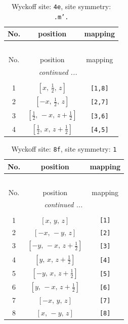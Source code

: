 \documentclass[fleqn,8pt]{jsarticle}
\begin{document}
\begin{longtable}{ccc}
\caption{Wyckoff site: {\tt 4e}, site symmetry: {\tt .m'.}}
 \\
 \hline \hline
No. & position & mapping \\ \hline \endfirsthead

\multicolumn{2}{l}{\tablename\ \thetable{}} \\
 \hline \hline
No. & position & mapping \\ \hline \endhead

 \hline \hline
\multicolumn{2}{r}{\footnotesize\it continued ...} \\ \endfoot

 \hline \hline
\multicolumn{2}{r}{} \\ \endlastfoot

1 & $\left[ x,\, \frac{1}{2},\, z \right]$ & {\tt [1,8]} \\ \hline
2 & $\left[ - x,\, \frac{1}{2},\, z \right]$ & {\tt [2,7]} \\ \hline
3 & $\left[ \frac{1}{2},\, - x,\, z + \frac{1}{2} \right]$ & {\tt [3,6]} \\ \hline
4 & $\left[ \frac{1}{2},\, x,\, z + \frac{1}{2} \right]$ & {\tt [4,5]} \\
\end{longtable}
\renewcommand{\arraystretch}{1.2}
\begin{longtable}{ccc}
\caption{Wyckoff site: {\tt 8f}, site symmetry: {\tt 1}}
 \\
 \hline \hline
No. & position & mapping \\ \hline \endfirsthead

\multicolumn{2}{l}{\tablename\ \thetable{}} \\
 \hline \hline
No. & position & mapping \\ \hline \endhead

 \hline \hline
\multicolumn{2}{r}{\footnotesize\it continued ...} \\ \endfoot

 \hline \hline
\multicolumn{2}{r}{} \\ \endlastfoot

1 & $\left[ x,\, y,\, z \right]$ & {\tt [1]} \\ \hline
2 & $\left[ - x,\, - y,\, z \right]$ & {\tt [2]} \\ \hline
3 & $\left[ - y,\, - x,\, z + \frac{1}{2} \right]$ & {\tt [3]} \\ \hline
4 & $\left[ y,\, x,\, z + \frac{1}{2} \right]$ & {\tt [4]} \\ \hline
5 & $\left[ - y,\, x,\, z + \frac{1}{2} \right]$ & {\tt [5]} \\ \hline
6 & $\left[ y,\, - x,\, z + \frac{1}{2} \right]$ & {\tt [6]} \\ \hline
7 & $\left[ - x,\, y,\, z \right]$ & {\tt [7]} \\ \hline
8 & $\left[ x,\, - y,\, z \right]$ & {\tt [8]} \\
\end{longtable}
\end{document}

